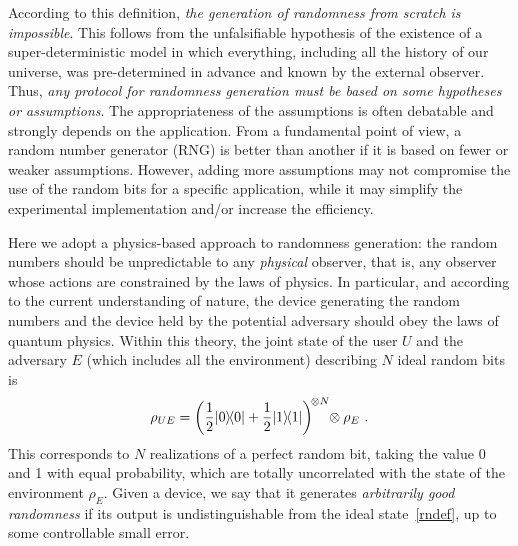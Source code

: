 \documentclass[11pt,a4paper]{article}
\newcommand{\ket}[1]{| #1 \rangle}
\newcommand{\bra}[1]{\langle #1 |}
\newcommand{\proj}[1]{\ket{#1}\!\bra{#1}}
\begin{document}
According to this definition, \emph{the generation of randomness
from scratch is impossible}. This follows from the unfalsifiable hypothesis of the existence of a super-deterministic
model in which everything, including all the history of our
universe, was pre-determined in advance and known by the external
observer. Thus, \emph{any protocol for randomness generation must be
based on some hypotheses or assumptions}. The appropriateness of the assumptions is often debatable and strongly depends on the
application. From a fundamental point of view, a random number
generator (RNG) is better than another if it is based on fewer or weaker
assumptions. However, adding more assumptions may not compromise
the use of the random bits for a specific application, while it
may simplify the experimental implementation and/or increase the
efficiency. %


Here we adopt a physics-based approach to randomness generation: the random numbers
should be unpredictable to any
\emph{physical} observer,
that is, any observer whose actions are constrained by the laws of physics.
In particular, and
according to the current understanding of nature, the device generating the random numbers and the device held by the potential adversary should obey the laws of quantum physics.
Within this theory, the joint state of the user $U$
and the adversary $E$ (which includes all the environment) describing $N$ ideal random bits is
\begin{equation}\label{rndef}
    \rho_{UE}=
    \left(\frac{1}{2}\proj{0}+\frac{1}{2}\proj{1}\right)^{\!\otimes N}
    \hspace{-1mm} \otimes \rho_E\ .
\end{equation}
This corresponds to $N$ realizations of a perfect random %
bit, taking the value 0 and 1 with equal
probability, which are totally uncorrelated with the state of the environment $\rho_E$.
Given a device, we say that it generates \emph{arbitrarily good randomness} if its output is undistinguishable from the ideal state~\eqref{rndef}, up to some controllable small error.
\end{document}
